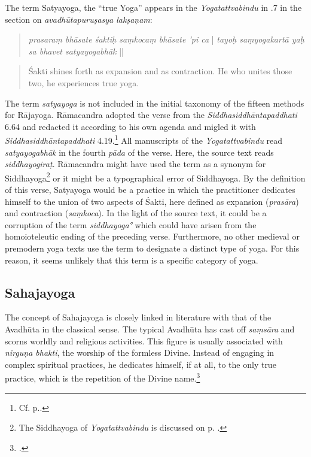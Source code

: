 The term Satyayoga, the ``true Yoga'' appears in the \emph{Yogatattvabindu} in .7 in the section on \textit{avadhūtapuruṣasya lakṣaṇam}:

\begin{quote}
  \textit{prasaraṃ bhāsate śaktiḥ saṃkocaṃ bhāsate 'pi ca} |
  \textit{tayoḥ saṃyogakartā yaḥ sa bhavet satyayogabhāk} ||
\end{quote}
\begin{quote}
   Śakti shines forth as expansion and as contraction. He who unites those two, he experiences true yoga.
  \end{quote}

  The term \textit{satyayoga} is not included in the initial taxonomy of the fifteen methods for Rājayoga. Rāmacandra adopted the verse from the \emph{Siddhasiddhāntapaddhati} 6.64 and redacted it according to his own agenda and migled it with \emph{Siddhasiddhāntapaddhati} 4.19.\footnote{Cf. p.\pageref{satyaavadhuta}.} All manuscripts of the \emph{Yogatattvabindu} read \textit{satyayogabhāk} in the fourth \textit{pāda} of the verse. Here, the source text reads \textit{siddhayogiraṭ}. Rāmacandra might have used the term as a synonym for Siddhayoga\footnote{The Siddhayoga of \textit{Yogatattvabindu} is discussed on p. \pageref{siddhayogaintro}.} or it might be a typographical error of Siddhayoga. By the definition of this verse, Satyayoga would be a practice in which the practitioner dedicates himself to the union of two aspects of Śakti, here defined as expansion (\textit{prasāra}) and contraction (\textit{saṃkoca}). In the light of the source text, it could be a corruption of the term \textit{siddhayoga°} which could have arisen from the homoioteleutic ending of the preceding verse. Furthermore, no other medieval or premodern yoga texts use the term to designate a distinct type of yoga. For this reason, it seems unlikely that this term is a specific category of yoga. 
  
\subsection{Sahajayoga}
\label{sahajayoga}

The concept of Sahajayoga is closely linked in literature with that of the Avadhūta in the classical sense. The typical Avadhūta has cast off \textit{saṃsāra} and scorns worldly and religious activities. This figure is usually associated with \textit{nirguṇa bhakti}, the worship of the formless Divine. Instead of engaging in complex spiritual practices, he dedicates himself, if at all, to the only true practice, which is the repetition of the Divine name.\footnote{\citeauthor[2011: 15]{mallinsonnath}.}

